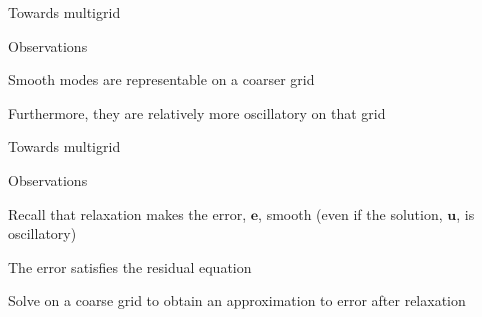 \documentclass[18pt,xcolor=table]{beamer}
\begin{document}
\begin{frame}{Towards multigrid}
\begin{block}{Observations}
\bit
\item Smooth modes are representable on a coarser grid
\item Furthermore, they are relatively more oscillatory on that grid 
\eit
\end{block}
\end{frame}

\begin{frame}{Towards multigrid}
\begin{block}{Observations}
\bit
\item Recall that relaxation makes the error, $\mathbf{e}$, smooth (even if the solution, $\mathbf{u}$, is oscillatory)
\item The error satisfies the residual equation
\item Solve on a coarse grid to obtain an approximation to error after relaxation
\eit
\end{block}
\end{frame}
\end{document}
